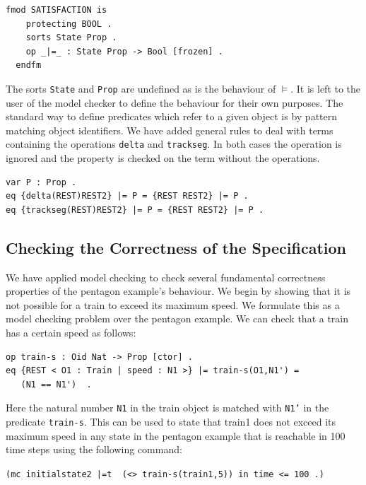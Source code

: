 \begin{lstlisting}[caption =  The Maude Satisfaction module, label =code:satisfaction ]
  fmod SATISFACTION is  
    protecting BOOL .  
    sorts State Prop .  
    op _|=_ : State Prop -> Bool [frozen] .  
  endfm
\end{lstlisting}
\medskip
The sorts \texttt{State} and \texttt{Prop} are undefined as is the behaviour of $\models$. It is left to the user of the model checker to define the behaviour for their own purposes. The standard way to define predicates which refer to a given object is by pattern matching object identifiers. We have added general rules to deal with terms containing the operations \texttt{delta} and \texttt{trackseg}. In both cases the operation is ignored and the property is checked on the term without the operations.

\begin{lstlisting}[caption = Rewriting rules to deal with delta and trackseg operations]
var P : Prop .
eq {delta(REST)REST2} |= P = {REST REST2} |= P .
eq {trackseg(REST)REST2} |= P = {REST REST2} |= P .
\end{lstlisting}

\subsection*{Checking the  Correctness of the Specification}

We have applied model checking to check several fundamental correctness properties of the pentagon example's behaviour. We begin by showing that it is not possible for a train to exceed its maximum speed. We formulate this as a model checking problem over the pentagon example.  We can check that a train has a certain speed as follows:

\begin{lstlisting}[caption = The speed property]
op train-s : Oid Nat -> Prop [ctor] .
eq {REST < O1 : Train | speed : N1 >} |= train-s(O1,N1') = 
   (N1 == N1')  .
\end{lstlisting}

Here the natural number \texttt{N1} in the train object is matched with \texttt{N1'} in the predicate \texttt{train-s}. This can be used to state that train1 does not exceed its maximum speed in any state in the pentagon  example that is reachable in 100 time steps using the following command:

\begin{center}
\texttt{(mc initialstate2 |=t  ~(<> train-s(train1,5)) in time <= 100 .)}
\end{center}

